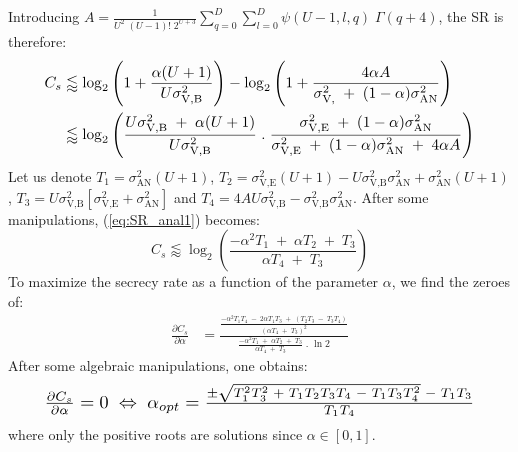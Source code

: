 \documentclass[conference]{IEEEtran}
\begin{document}
Introducing $A = \frac{1}{U^2 \; (U-1)!\; 2^{U+3}} \sum_{q=0}^{D}\sum_{l=0}^{D} \psi(U-1,l,q) \; \Gamma(q+4)$, the SR is therefore:
\begin{equation}
\resizebox{0.89\hsize}{!}{$
\begin{split}
    C_s &\lessapprox \log_2 \left(1 + \frac{\alpha (U+1)}{U \sigma_{\text{V,B}}^2} \right)  - \log_2\left( 1 + \frac{4\alpha A }{\sigma^2_{\text{V,}} \; + \; (1-\alpha) \sigma^2_{\text{AN}} } \right)\\
    &\lessapprox \log_2 \left( \frac{U \sigma_{\text{V,B}}^2 \; + \; \alpha (U+1)}{U  \sigma_{\text{V,B}}^2} \; . \; \frac{\sigma^2_{\text{V,E}} \; + \; (1-\alpha) \sigma^2_{\text{AN}}}{\sigma^2_{\text{V,E}} \; + \; (1-\alpha) \sigma^2_{\text{AN}} \; + \; 4\alpha A } \right)
    \label{eq:SR_anal1}
\end{split}$}
\end{equation}
Let us denote $T_1 = \sigma^2_{\text{AN}}(U+1)$, $T_2 = \sigma^2_{\text{V,E}}(U+1) -  U \sigma_{\text{V,B}}^2\sigma^2_{\text{AN}}  + \sigma^2_{\text{AN}}(U+1)$, $T_3 = U \sigma_{\text{V,B}}^2 \left[ \sigma^2_{\text{V,E}}  +  \sigma^2_{\text{AN}}\right]$ and $T_4 = 4A U \sigma_{\text{V,B}}^2 -  \sigma_{\text{V,B}}^2\sigma^2_{\text{AN}}$. After some manipulations, (\ref{eq:SR_anal1}) becomes:
\begin{equation}
    C_s \lessapprox \log_2 \left( \frac{-\alpha^2 T_1 \; + \; \alpha T_2 \; + \; T_3}{\alpha T_4 \; + \; T_3} \right)
    \label{eq:SR_anal2}
\end{equation}
To  maximize the secrecy rate as a function of the parameter $\alpha$, we find the zeroes of:
\begin{equation}
\begin{split}
    \frac{\partial C_s}{\partial \alpha} &= \frac{ \frac{-\alpha^2 T_1 T_4 \; - \; 2 \alpha T_1 T_3 \; + \; \left( T_2 T_3 \; - \; T_3 T_4 \right) }{\left( \alpha T_4 \; + \; T_3\right)^2} }{ \frac{-\alpha^2 T_1 \; + \; \alpha T_2 \; + \; T_3}{\alpha T_4 \; + \; T_3} \; . \; \ln{2}} 
    \label{eq:SR_derivative}
\end{split}
\end{equation}
After some algebraic manipulations, one obtains: 
\begin{equation}
\resizebox{0.89\hsize}{!}{$
         \frac{\partial C_s}{\partial \alpha} = 0
         \; \Leftrightarrow \; \alpha_{opt} = \frac{\pm\sqrt{T_1^2 T_3^2 \; + \; T_1 T_2 T_3 T_4 \; - \; T_1 T_3 T_4^2} \; - \; T_1 T_3}{T_1 T_4}$}
         \label{eq:best_alpha}
\end{equation}
where only the positive roots are solutions since $\alpha \in [0,1]$.
\end{document}
